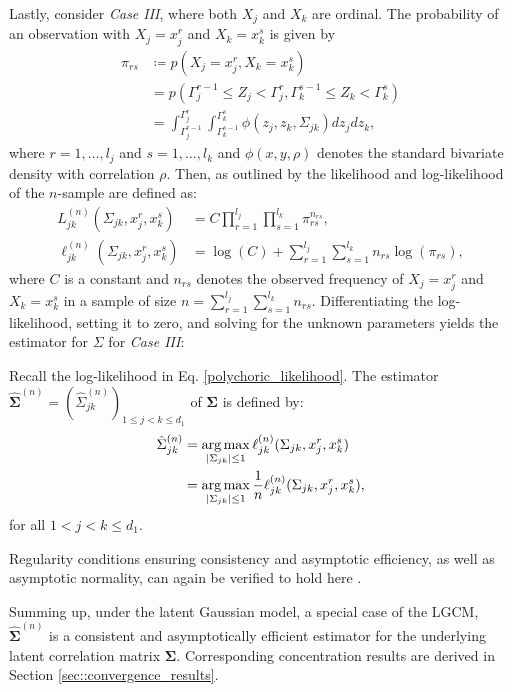 Lastly, consider \textit{Case III}, where both $X_j$ and $X_k$ are ordinal. The probability of an observation with $X_j = x^r_j$ and $X_k = x^s_k$ is given by
\begin{equation}\label{cell_probabilities}
    \begin{split}
        \pi_{rs} &\coloneqq p(X_j = x^r_j, X_k = x^s_k) \\
        &= p(\Gamma_j^{r-1} \leq Z_j < \Gamma_j^r, \Gamma_k^{s-1} \leq Z_k < \Gamma_k^s) \\
        &= \int_{\Gamma_j^{r-1}}^{\Gamma_j^{r}} \int_{\Gamma_k^{s-1}}^{\Gamma_k^{s}} \phi(z_j,z_k,\Sigma_{jk}) dz_j dz_k,
    \end{split}
\end{equation}
where $r = 1, \dots, l_j$ and $s = 1, \dots, l_k$ and $\phi(x,y,\rho)$ denotes the standard bivariate density with correlation $\rho$. Then, as outlined by \citet{Olsson79} the likelihood and log-likelihood of the $n$-sample are defined as:
\begin{equation}\label{polychoric_likelihood}
    \begin{split}
        L_{jk}^{(n)}(\Sigma_{jk}, x_j^r,x_k^s) &= C \prod_{r=1}^{l_{{j}}} \prod_{s=1}^{l_{{k}}} \pi_{rs}^{n_{rs}}, \\
        \ell_{jk}^{(n)}(\Sigma_{jk}, x_j^r,x_k^s) &= \log(C) + \sum_{r=1}^{l_{{j}}}\sum_{s=1}^{l_{k}} n_{rs} \log(\pi_{rs}),
    \end{split}
\end{equation}
where $C$ is a constant and $n_{rs}$ denotes the observed frequency of $X_j = x^r_j$ and $X_k = x^s_k$ in a sample of size $n= \sum_{r=1}^{l_{{j}}}\sum_{s=1}^{l_{{k}}} n_{rs}$. Differentiating the log-likelihood, setting it to zero, and solving for the unknown parameters yields the estimator for $\Sigma$ for \textit{Case III}:
\begin{definition}\label{definition_case3}
    Recall the log-likelihood in Eq. \eqref{polychoric_likelihood}. The estimator $\hat{\mathbf{\Sigma}}^{(n)} = (\hat{\Sigma}_{jk}^{(n)})_{1\leq j < k\leq d_1}$ of $\mathbf{\Sigma}$ is defined by:
    \begin{equation}
        \begin{split}
            \hat{\Sigma}_{jk}^{(n)} &= \argmax_{\Abs{\Sigma_{jk}} \leq 1} \ell_{jk}^{(n)}(\Sigma_{jk}, x_j^r,x_k^s) \\
            &= \argmax_{\Abs{\Sigma_{jk}} \leq 1} \frac{1}{n} \ell_{jk}^{(n)}(\Sigma_{jk}, x_j^r,x_k^s),
        \end{split}
    \end{equation}
    for all $1 < j < k \leq d_1 $.
\end{definition}
\noindent Regularity conditions ensuring consistency and asymptotic efficiency, as well as asymptotic normality, can again be verified to hold here \cite{Wallentin17}.

Summing up, under the latent Gaussian model, a special case of the LGCM, $\hat{\mathbf{\Sigma}}^{(n)}$ is a consistent and asymptotically efficient estimator for the underlying latent correlation matrix $\mathbf{\Sigma}$. Corresponding concentration results are derived in Section \ref{sec::convergence_results}.